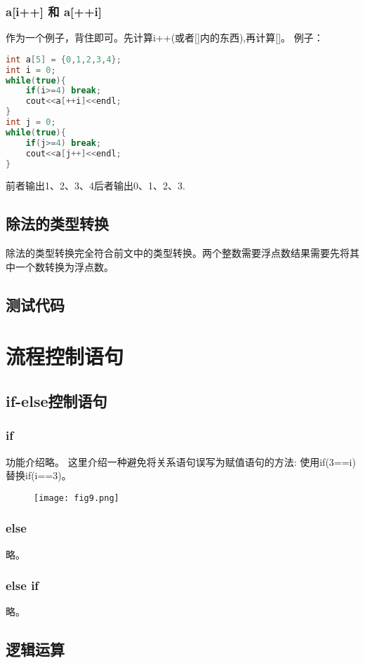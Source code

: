 \documentclass{article}
\begin{document}
    \subsubsection{a[i++] 和 a[++i]}
    作为一个例子，背住即可。先计算i++(或者[]内的东西),再计算[]。
    例子：
\begin{lstlisting}[language=c++]
int a[5] = {0,1,2,3,4};
int i = 0;
while(true){
    if(i>=4) break;
    cout<<a[++i]<<endl;
}
int j = 0;
while(true){
    if(j>=4) break;
    cout<<a[j++]<<endl;
}
\end{lstlisting}
    前者输出1、2、3、4后者输出0、1、2、3.

    \subsection{除法的类型转换}
    除法的类型转换完全符合前文中的类型转换。两个整数需要浮点数结果需要先将其中一个数转换为浮点数。

    \subsection{测试代码}
    


    \section{流程控制语句} 
    \subsection{if-else控制语句}
    \subsubsection{if}
        功能介绍略。
        这里介绍一种避免将关系语句误写为赋值语句的方法:
        使用if(3==i)替换if(i==3)。
        \begin{figure}[H]
            \centering
            \texttt{[image: fig9.png]}
        \end{figure}
    \subsubsection{else}
        略。
    \subsubsection{else if}
        略。

    \subsection{逻辑运算}
\end{document}
